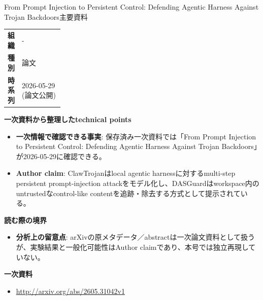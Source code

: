 \begin{technicalnote}{From Prompt Injection to Persistent Control: Defending Agentic Harness Against Trojan Backdoors}{主要資料}
\begingroup
\begin{tabularx}{\linewidth}{@{}>{\bfseries}p{0.22\linewidth}X@{}}
組織 & - \\
種別 & 論文 \\
時系列 & 2026-05-29 (論文公開) \\
\end{tabularx}
\smallskip
{\bfseries 一次資料から整理したtechnical points}
\begin{itemize}[leftmargin=1.5em,itemsep=0.35em]
\item \textbf{一次情報で確認できる事実}: 保存済み一次資料では「From Prompt Injection to Persistent Control: Defending Agentic Harness Against Trojan Backdoors」が2026-05-29に確認できる。
\end{itemize}
\begin{minipage}{\linewidth}
\begin{itemize}[leftmargin=1.5em,itemsep=0.35em]
\item \textbf{Author claim}: ClawTrojanはlocal agentic harnessに対するmulti-step persistent prompt-injection attackをモデル化し、DASGuardはworkspace内のuntrustedなcontrol-like contentを追跡・除去する方式として提示されている。
\end{itemize}
{\bfseries 読む際の境界}
\begin{itemize}[leftmargin=1.5em,itemsep=0.35em]
\item \textbf{分析上の留意点}: arXivの原メタデータ／abstractは一次論文資料として扱うが、実験結果と一般化可能性はAuthor claimであり、本号では独立再現していない。
\end{itemize}
\begin{samepage}
{\bfseries 一次資料}
\begingroup\sloppy
\begin{itemize}[leftmargin=1.5em,itemsep=0.25em]
\item {\scriptsize\url{http://arxiv.org/abs/2605.31042v1}}
\end{itemize}
\endgroup
\end{samepage}
\end{minipage}
\endgroup
\end{technicalnote}
\medskip

